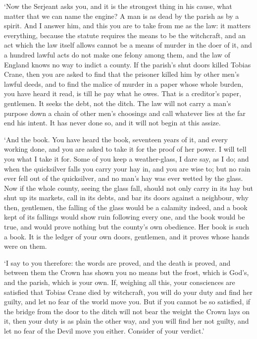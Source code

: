 \documentclass[11pt]{article}
\begin{document}
`Now the Serjeant asks you, and it is the strongest thing in his cause, what matter that we can name the engine? A man is as dead by the parish as by a spirit. And I answer him, and this you are to take from me as the law: it matters everything, because the statute requires the means to be the witchcraft, and an act which the law itself allows cannot be a means of murder in the doer of it, and a hundred lawful acts do not make one felony among them, and the law of England knows no way to indict a county. If the parish's shut doors killed Tobias Crane, then you are asked to find that the prisoner killed him by other men's lawful deeds, and to find the malice of murder in a paper whose whole burden, you have heard it read, is till he pay what he owes. That is a creditor's paper, gentlemen. It seeks the debt, not the ditch. The law will not carry a man's purpose down a chain of other men's choosings and call whatever lies at the far end his intent. It has never done so, and it will not begin at this assize.

`And the book. You have heard the book, seventeen years of it, and every working done, and you are asked to take it for the proof of her power. I will tell you what I take it for. Some of you keep a weather-glass, I dare say, as I do; and when the quicksilver falls you carry your hay in, and you are wise to; but no rain ever fell out of the quicksilver, and no man's hay was ever wetted by the glass. Now if the whole county, seeing the glass fall, should not only carry in its hay but shut up its markets, call in its debts, and bar its doors against a neighbour, why then, gentlemen, the falling of the glass would be a calamity indeed, and a book kept of its fallings would show ruin following every one, and the book would be true, and would prove nothing but the county's own obedience. Her book is such a book. It is the ledger of your own doors, gentlemen, and it proves whose hands were on them.

`I say to you therefore: the words are proved, and the death is proved, and between them the Crown has shown you no means but the frost, which is God's, and the parish, which is your own. If, weighing all this, your consciences are satisfied that Tobias Crane died by witchcraft, you will do your duty and find her guilty, and let no fear of the world move you. But if you cannot be so satisfied, if the bridge from the door to the ditch will not bear the weight the Crown lays on it, then your duty is as plain the other way, and you will find her not guilty, and let no fear of the Devil move you either. Consider of your verdict.'
\end{document}
